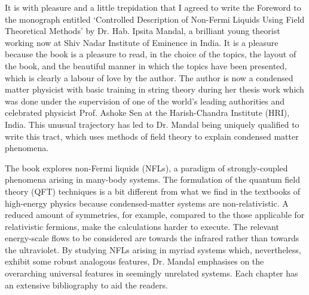 %
%

\foreword

It is with pleasure and a little trepidation that I agreed to write the Foreword to the monograph
entitled `Controlled Description of Non-Fermi Liquids Using Field Theoretical Methods' by
Dr. Hab. Ipsita Mandal, a brilliant young theorist working now at Shiv Nadar Institute of Eminence in India.
It is a pleasure because the book is a pleasure to read, in the choice of the topics, the 
layout of the book, and the beautiful manner in which the topics have been presented,
which is clearly a labour of love by the author.  The author is now a condensed matter
physicist with basic training in string theory during her thesis work which was done under
the supervision of one of the world's leading authorities and celebrated physicist Prof. Ashoke
Sen at the Harish-Chandra Institute (HRI), India.  This unusual trajectory has led to
Dr. Mandal being uniquely qualified to write this tract, which uses methods of field theory
to explain condensed matter phenomena.  

The book explores non-Fermi liquids (NFLs), a paradigm of strongly-coupled phenomena arising in many-body systems.
The formulation of the quantum field theory (QFT) techniques is a bit different from what we find in the textbooks of high-energy physics
because condensed-matter systems are non-relativistic. A reduced amount of symmetries, for example, compared to the those applicable for relativistic fermions, make the calculations harder to execute.
The relevant energy-scale flows to be considered are towards the
infrared rather than towards the ultraviolet. By studying NFLs arising in myriad systems which, nevertheless, exhibit some robust analogous features, Dr. Mandal emphasises on the overarching universal features in seemingly unrelated systems. Each chapter has an extensive bibliography
to aid the readers. 

